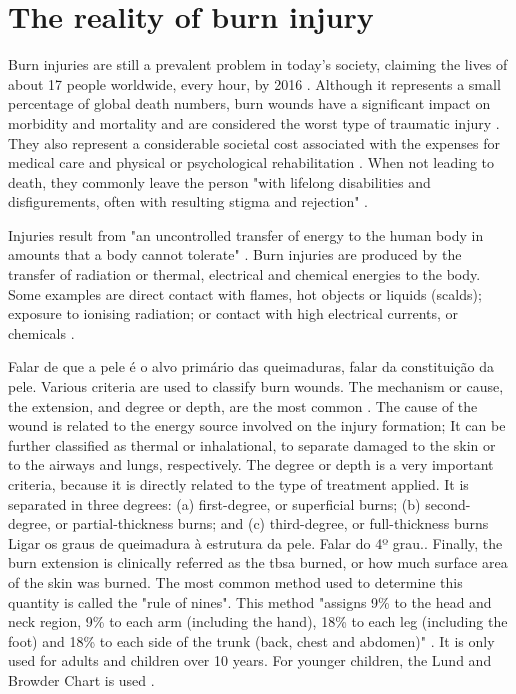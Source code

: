 \section{The reality of burn injury} %
\label{sec:the_reality_of_burn_injury}

Burn injuries are still a prevalent problem in today's society, claiming the lives of about 17 people worldwide, every hour, by 2016 \cite{GHE2016_xls}. Although it represents a small percentage of global death numbers, burn wounds have a significant impact on morbidity and mortality and are considered the worst type of traumatic injury \cite{isbi_guidelines_burn_care}. They also represent a considerable societal cost associated with the expenses for medical care and physical or psychological rehabilitation \cite{Brusselaers_2010_europe_systematic_review}. When not leading to death, they commonly leave the person "with lifelong disabilities and disfigurements, often with resulting stigma and rejection" \cite{who2011_sucess_stories}.

Injuries result from "an uncontrolled transfer of energy to the human body in amounts that a body cannot tolerate" \cite{who2011_sucess_stories}. Burn injuries are produced by the transfer of radiation or thermal, electrical and chemical energies to the body. Some examples are direct contact with flames, hot objects or liquids (scalds); exposure to ionising radiation; or contact with high electrical currents, or chemicals \cite{who_unicef2008_burns_chapter}.

{\color{red} Falar de que a pele é o alvo primário das queimaduras, falar da constituição da pele.}
Various criteria are used to classify burn wounds. The mechanism or cause, the extension, and degree or depth, are the most common \cite{who_unicef2008_burns_chapter}. The cause of the wound is related to the energy source involved on the injury formation; It can be further classified as thermal or inhalational, to separate damaged to the skin or to the airways and lungs, respectively. The degree or depth is a very important criteria, because it is directly related to the type of treatment applied. It is separated in three degrees: (a) first-degree, or superficial burns; (b) second-degree, or partial-thickness burns; and (c) third-degree, or full-thickness burns {\color{red} Ligar os graus de queimadura à estrutura da pele. Falar do 4º grau.}. Finally, the burn extension is clinically referred as the \gls{tbsa} burned, or how much surface area of the skin was burned. The most common method used to determine this quantity is called the "rule of nines". This method "assigns 9\% to the head and neck region, 9\% to each arm (including the hand), 18\% to each leg (including the foot) and 18\% to each side of the trunk (back, chest and abdomen)" \cite{who_unicef2008_burns_chapter}. It is only used for adults and children over 10 years. For younger children, the Lund and Browder Chart is used \cite{MacLennan1998_anesthesia_thermal_injury}. 


